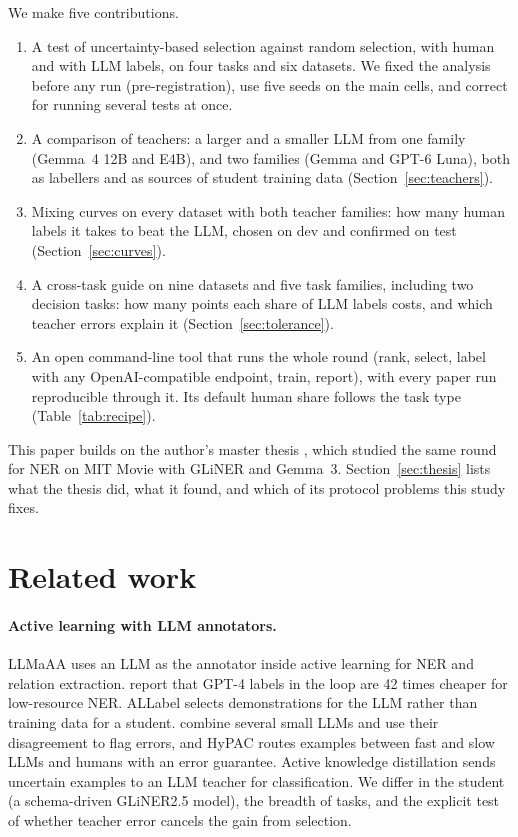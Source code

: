 \documentclass[11pt]{article}
\begin{document}
We make five contributions.

\begin{enumerate}
\item A test of uncertainty-based selection against random selection, with human and with LLM labels, on four tasks and six datasets. We fixed the analysis before any run (pre-registration), use five seeds on the main cells, and correct for running several tests at once.
\item A comparison of teachers: a larger and a smaller LLM from one family (Gemma~4 12B and E4B), and two families (Gemma and GPT-6 Luna), both as labellers and as sources of student training data (Section~\ref{sec:teachers}).
\item Mixing curves on every dataset with both teacher families: how many human labels it takes to beat the LLM, chosen on dev and confirmed on test (Section~\ref{sec:curves}).
\item A cross-task guide on nine datasets and five task families, including two decision tasks: how many points each share of LLM labels costs, and which teacher errors explain it (Section~\ref{sec:tolerance}).
\item An open command-line tool that runs the whole round (rank, select, label with any OpenAI-compatible endpoint, train, report), with every paper run reproducible through it. Its default human share follows the task type (Table~\ref{tab:recipe}).
\end{enumerate}

This paper builds on the author's master thesis \citep{thomas2025thesis}, which studied the same round for NER on MIT Movie with GLiNER and Gemma~3. Section~\ref{sec:thesis} lists what the thesis did, what it found, and which of its protocol problems this study fixes.

\section{Related work}

\paragraph{Active learning with LLM annotators.} LLMaAA \citep{llmaaa2023} uses an LLM as the annotator inside active learning for NER and relation extraction. \citet{llmsloop2024} report that GPT-4 labels in the loop are 42 times cheaper for low-resource NER. ALLabel \citep{allabel2025} selects demonstrations for the LLM rather than training data for a student. \citet{mixllm2026} combine several small LLMs and use their disagreement to flag errors, and HyPAC \citep{hypac2026} routes examples between fast and slow LLMs and humans with an error guarantee. Active knowledge distillation \citep{activekd2025} sends uncertain examples to an LLM teacher for classification. We differ in the student (a schema-driven GLiNER2.5 model), the breadth of tasks, and the explicit test of whether teacher error cancels the gain from selection.
\end{document}
